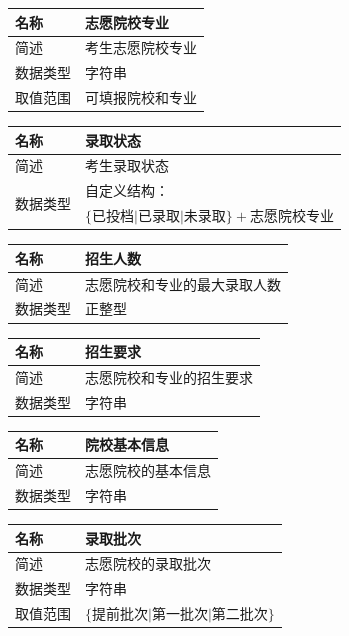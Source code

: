\documentclass[CJK,utf8]{ctexrep}
\begin{document}
\begin{tabularx}{0.85\textwidth}{|l|X|}
	\hline
	\textbf{名称} & \textbf{志愿院校专业} \\
	\hline
	简述 & 考生志愿院校专业 \\
	\hline
	数据类型 & 字符串 \\
	\hline
	取值范围 & 可填报院校和专业 \\
	\hline
\end{tabularx}

\begin{tabularx}{0.85\textwidth}{|l|X|}
	\hline
	\textbf{名称} & \textbf{录取状态} \\
	\hline
	简述 & 考生录取状态 \\
	\hline
	\multirow{2}{*}{数据类型} & 自定义结构：\\
	& $\lbrace\text{已投档}\vert\text{已录取}\vert\text{未录取}
	\rbrace+\text{志愿院校专业}$ \\
	\hline
\end{tabularx}

\begin{tabularx}{0.85\textwidth}{|l|X|}
	\hline
	\textbf{名称} & \textbf{招生人数} \\
	\hline
	简述 & 志愿院校和专业的最大录取人数 \\
	\hline
	数据类型 & 正整型 \\
	\hline
\end{tabularx}

\begin{tabularx}{0.85\textwidth}{|l|X|}
	\hline
	\textbf{名称} & \textbf{招生要求} \\
	\hline
	简述 & 志愿院校和专业的招生要求 \\
	\hline
	数据类型 & 字符串 \\
	\hline
\end{tabularx}

\begin{tabularx}{0.85\textwidth}{|l|X|}
	\hline
	\textbf{名称} & \textbf{院校基本信息} \\
	\hline
	简述 & 志愿院校的基本信息 \\
	\hline
	数据类型 & 字符串 \\
	\hline
\end{tabularx}

\begin{tabularx}{0.85\textwidth}{|l|X|}
	\hline
	\textbf{名称} & \textbf{录取批次} \\
	\hline
	简述 & 志愿院校的录取批次\\
	\hline
	数据类型 & 字符串 \\
	\hline
	取值范围 & $\lbrace\text{提前批次}\vert\text{第一批次}\vert
	\text{第二批次}\rbrace$ \\
	\hline
\end{tabularx}
\end{document}
